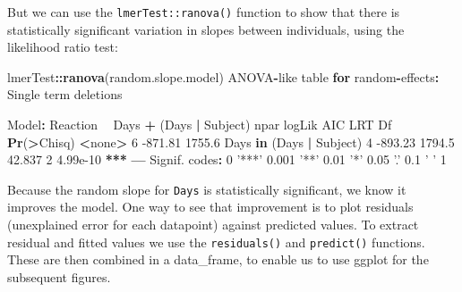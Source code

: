 \documentclass[]{article}
\newenvironment{Shaded}{\begin{snugshade}}{\end{snugshade}}
\newcommand{\ControlFlowTok}[1]{\textcolor[rgb]{0.13,0.29,0.53}{\textbf{#1}}}
\newcommand{\DecValTok}[1]{\textcolor[rgb]{0.00,0.00,0.81}{#1}}
\newcommand{\ErrorTok}[1]{\textcolor[rgb]{0.64,0.00,0.00}{\textbf{#1}}}
\newcommand{\FloatTok}[1]{\textcolor[rgb]{0.00,0.00,0.81}{#1}}
\newcommand{\KeywordTok}[1]{\textcolor[rgb]{0.13,0.29,0.53}{\textbf{#1}}}
\newcommand{\NormalTok}[1]{#1}
\newcommand{\OperatorTok}[1]{\textcolor[rgb]{0.81,0.36,0.00}{\textbf{#1}}}
\newcommand{\StringTok}[1]{\textcolor[rgb]{0.31,0.60,0.02}{#1}}
\begin{document}
But we can use the \texttt{lmerTest::ranova()} function to show that there is
statistically significant variation in slopes between individuals, using the
likelihood ratio test:

\begin{Shaded}
\begin{Highlighting}[]
\NormalTok{lmerTest}\OperatorTok{::}\KeywordTok{ranova}\NormalTok{(random.slope.model)}
\NormalTok{ANOVA}\OperatorTok{-}\NormalTok{like table }\ControlFlowTok{for}\NormalTok{ random}\OperatorTok{-}\NormalTok{effects}\OperatorTok{:}\StringTok{ }\NormalTok{Single term deletions}

\NormalTok{Model}\OperatorTok{:}
\NormalTok{Reaction }\OperatorTok{~}\StringTok{ }\NormalTok{Days }\OperatorTok{+}\StringTok{ }\NormalTok{(Days }\OperatorTok{|}\StringTok{ }\NormalTok{Subject)}
\NormalTok{                         npar  logLik    AIC    LRT Df }\KeywordTok{Pr}\NormalTok{(}\OperatorTok{>}\NormalTok{Chisq)    }
\OperatorTok{<}\NormalTok{none}\OperatorTok{>}\StringTok{                      }\DecValTok{6} \FloatTok{-871.81} \FloatTok{1755.6}                         
\NormalTok{Days }\ControlFlowTok{in}\NormalTok{ (Days }\OperatorTok{|}\StringTok{ }\NormalTok{Subject)    }\DecValTok{4} \FloatTok{-893.23} \FloatTok{1794.5} \FloatTok{42.837}  \DecValTok{2}   \FloatTok{4.99e-10} \OperatorTok{**}\ErrorTok{*}
\OperatorTok{---}
\NormalTok{Signif. codes}\OperatorTok{:}\StringTok{  }\DecValTok{0} \StringTok{'***'} \FloatTok{0.001} \StringTok{'**'} \FloatTok{0.01} \StringTok{'*'} \FloatTok{0.05} \StringTok{'.'} \FloatTok{0.1} \StringTok{' '} \DecValTok{1}
\end{Highlighting}
\end{Shaded}

Because the random slope for \texttt{Days} is statistically significant, we know it
improves the model. One way to see that improvement is to plot residuals
(unexplained error for each datapoint) against predicted values. To extract
residual and fitted values we use the \texttt{residuals()} and \texttt{predict()} functions.
These are then combined in a data\_frame, to enable us to use ggplot for the
subsequent figures.
\end{document}
